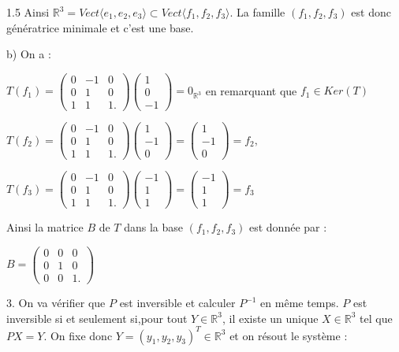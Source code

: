 \documentclass[12pt]{article}
\begin{document}
\begin{spacing}{1.5}
 Ainsi $\mathbb{R}^3=Vect\langle e_1,e_2,e_3\rangle\subset Vect\langle f_1,f_2,f_3\rangle$. La famille $(f_1,f_2,f_3)$ est donc génératrice minimale et c'est une base.
 
 b) On a :
 
 $
 T(f_1)=\begin{pmatrix}
 0 & -1 & 0 \\ 
 0 & 1 & 0 \\ 
 1 & 1 & 1.
 \end{pmatrix}\begin{pmatrix}
1\\
0\\
-1
\end{pmatrix}=0_{\mathbb{R}^3}
$ en remarquant que $f_1\in Ker(T)$

$
T(f_2)=\begin{pmatrix}
 0 & -1 & 0 \\ 
 0 & 1 & 0 \\ 
 1 & 1 & 1.
 \end{pmatrix}\begin{pmatrix}
1\\
-1\\
0
\end{pmatrix}=\begin{pmatrix}
1\\
-1\\
0
\end{pmatrix}=f_2,
$

$
T(f_3)=\begin{pmatrix}
 0 & -1 & 0 \\ 
 0 & 1 & 0 \\ 
 1 & 1 & 1.
 \end{pmatrix}\begin{pmatrix}
-1\\
1\\
1
\end{pmatrix}=\begin{pmatrix}
-1\\
1\\
1
\end{pmatrix}=f_3
$

Ainsi la matrice $B$ de $T$ dans la base $(f_1,f_2,f_3)$ est donnée par :

$
B=\begin{pmatrix}
 0 & 0 & 0 \\ 
 0 & 1 & 0 \\ 
 0 & 0 & 1.
 \end{pmatrix}
 $
 
 3. On va vérifier que $P$ est inversible et calculer $P^{-1}$ en même temps. $P$ est inversible si et seulement si,pour tout $Y\in \mathbb{R}^3$, il existe un unique $X\in \mathbb{R}^3$ tel que $PX=Y$. On fixe donc $Y=(y_1,y_2,y_3)^T\in \mathbb{R}^3$ et on résout le système : 
 

\end{spacing}
\end{document}
